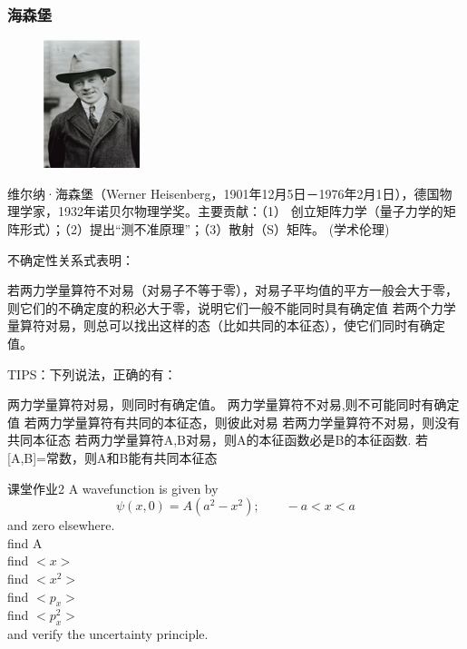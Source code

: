 \begin{frame}
    \frametitle{海森堡}
    \begin{figure} %
        \includegraphics[width=0.25\textwidth]{figs/hesb.png}   
    \end{figure}
    维尔纳·海森堡（Werner Heisenberg，1901年12月5日－1976年2月1日），德国物理学家，1932年诺贝尔物理学奖。主要贡献：（1） 创立矩阵力学（量子力学的矩阵形式）；（2）提出“测不准原理”；（3）散射（S）矩阵。 (学术伦理)
\end{frame}

\begin{frame} [allowframebreaks=]
    \begin{tcolorbox2}{不确定性关系式表明：}
    \begin{itemize}
        \Item 若两力学量算符不对易（对易子不等于零），对易子平均值的平方一般会大于零，则它们的不确定度的积必大于零，说明它们一般不能同时具有确定值
        \Item 若两个力学量算符对易，则总可以找出这样的态（比如共同的本征态），使它们同时有确定值。 
        \Item 
    \end{itemize}   
    \end{tcolorbox2}
\end{frame} 

\begin{frame} [allowframebreaks=]
    TIPS：下列说法，正确的有：
    \begin{enumerate}
        \Item 两力学量算符对易，则同时有确定值。 
        \Item 两力学量算符不对易,则不可能同时有确定值 
        \Item 若两力学量算符有共同的本征态，则彼此对易
        \Item 若两力学量算符不对易，则没有共同本征态
        \Item 若两力学量算符A,B对易，则A的本征函数必是B的本征函数.
        \Item 若[A,B]=常数，则A和B能有共同本征态
    \end{enumerate} 
\end{frame} 

\begin{frame} {}
    \begin{tcolorbox2}{课堂作业2}
     A wavefunction is given by \[ \psi(x,0)=A\left(a^2-x^2\right); \qquad -a<x<a \]
    and zero elsewhere.\\
    find A \\
    find $<x>$\\
    find $<x^2>$\\
    find $<p_x>$\\
    find $<p_x^ 2>$\\
    and verify the uncertainty principle. \\
    \end{tcolorbox2}
\end{frame} 

